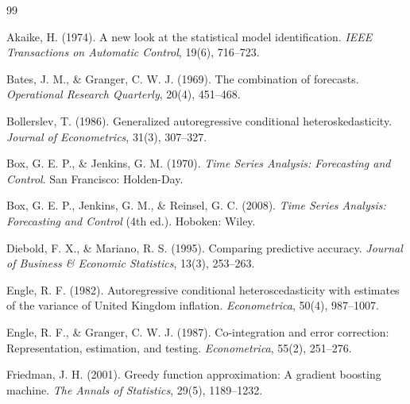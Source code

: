 \documentclass[12pt,a4paper,openany,oneside]{report}
\numberwithin{equation}{chapter}
\begin{document}
\clearpage
{}
\renewcommand{\bibname}{Tài liệu tham khảo}

\begin{thebibliography}{99}

Akaike, H. (1974). A new look at the statistical model identification.
\emph{IEEE Transactions on Automatic Control}, 19(6), 716--723.

Bates, J. M., \& Granger, C. W. J. (1969). The combination of forecasts.
\emph{Operational Research Quarterly}, 20(4), 451--468.

Bollerslev, T. (1986). Generalized autoregressive conditional
heteroskedasticity. \emph{Journal of Econometrics}, 31(3), 307--327.

Box, G. E. P., \& Jenkins, G. M. (1970). \emph{Time Series Analysis:
Forecasting and Control}. San Francisco: Holden-Day.

Box, G. E. P., Jenkins, G. M., \& Reinsel, G. C. (2008). \emph{Time
Series Analysis: Forecasting and Control} (4th ed.). Hoboken: Wiley.

Diebold, F. X., \& Mariano, R. S. (1995). Comparing predictive accuracy.
\emph{Journal of Business \& Economic Statistics}, 13(3), 253--263.

Engle, R. F. (1982). Autoregressive conditional heteroscedasticity with
estimates of the variance of United Kingdom inflation.
\emph{Econometrica}, 50(4), 987--1007.

Engle, R. F., \& Granger, C. W. J. (1987). Co-integration and error
correction: Representation, estimation, and testing.
\emph{Econometrica}, 55(2), 251--276.

Friedman, J. H. (2001). Greedy function approximation: A gradient
boosting machine. \emph{The Annals of Statistics}, 29(5), 1189--1232.


\end{thebibliography}
\end{document}
